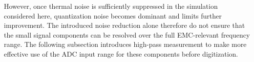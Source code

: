 However, once thermal noise is sufficiently suppressed in the simulation considered here, quantization noise becomes dominant and limits further improvement.
The introduced noise reduction alone therefore do not ensure that the small signal components can be resolved over the full EMC-relevant frequency range.
The following subsection introduces high-pass measurement to make more effective use of the ADC input range for these components before digitization.
